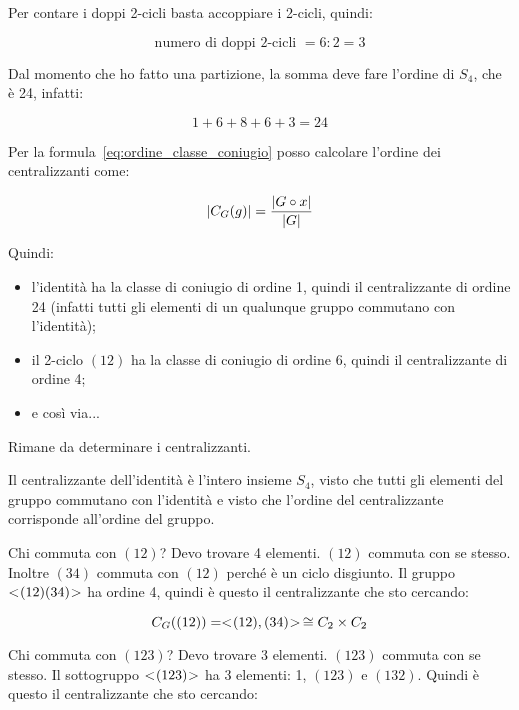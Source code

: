 \begin{soluzione}
	Per contare i doppi 2-cicli basta accoppiare i 2-cicli, quindi:
	
	\begin{equation}
		\text{numero di doppi 2-cicli } = 6 : 2 = 3
	\end{equation}
	
	Dal momento che ho fatto una partizione, la somma deve fare l'ordine di $S_4$, che è 24, infatti:
	
	\begin{equation}
		1 + 6 + 8 + 6 + 3 = 24
	\end{equation}
	
	Per la formula~\eqref{eq:ordine_classe_coniugio} posso calcolare l'ordine dei centralizzanti come:
	
	\begin{equation}
		\lvert C_G(g) \rvert = \dfrac{\lvert G \circ x \rvert}{\lvert G \rvert}
	\end{equation}

	Quindi:
	
	\begin{itemize}
		\item l'identità ha la classe di coniugio di ordine 1, quindi il centralizzante di ordine 24 (infatti tutti gli elementi di un qualunque gruppo commutano con l'identità);
		\item il 2-ciclo $(12)$ ha la classe di coniugio di ordine 6, quindi il centralizzante di ordine 4;
		\item e così via...
	\end{itemize}
	
	Rimane da determinare i centralizzanti.
	
	Il centralizzante dell'identità è l'intero insieme $S_4$, visto che tutti gli elementi del gruppo commutano con l'identità e visto che l'ordine del centralizzante corrisponde all'ordine del gruppo.
	
	Chi commuta con $(12)$? Devo trovare 4 elementi. $(12)$ commuta con se stesso. Inoltre $(34)$ commuta con $(12)$ perché è un ciclo disgiunto. Il gruppo $< \negmedspace (12)(34) \negmedspace >$ ha ordine 4, quindi è questo il centralizzante che sto cercando:
	
	\begin{equation}
		C_G((12)) = < \negmedspace (12),(34) \negmedspace > \,\cong C_2 \times C_2
	\end{equation}

	Chi commuta con $(123)$? Devo trovare 3 elementi. $(123)$ commuta con se stesso. Il sottogruppo $< \negmedspace (123) \negmedspace >$ ha 3 elementi: 1, $(123)$ e $(132)$. Quindi è questo il centralizzante che sto cercando:
	

\end{soluzione}
